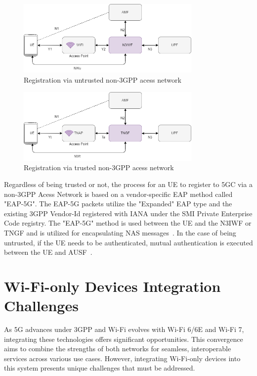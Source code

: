 \begin{figure}[htbp]
    \centering
    \includegraphics[width=0.8\textwidth]{figs/untrusted-non-3gpp-reg.png}
    \caption{Registration via untrusted non-\ac{3GPP} acess network}
    \label{fig:untrusted-non-3gpp-reg}
\end{figure}

\begin{figure}[htbp]
    \centering
    \includegraphics[width=0.8\textwidth]{figs/trusted-non-3gpp-reg.png}
    \caption{Registration via trusted non-\ac{3GPP} acess network}
    \label{fig:trusted-non-3gpp-reg}
\end{figure}

Regardless of being trusted or not, the process for an \ac{UE} to register to \ac{5GC} via a non-\ac{3GPP} Acess Network is based on a vendor-specific \ac{EAP} method called "\ac{EAP}-5G". The \ac{EAP-5G} packets utilize the "Expanded" \ac{EAP} type and the existing \ac{3GPP} Vendor-Id registered with \ac{IANA} under the \ac{SMI} Private Enterprise Code registry. The "\ac{EAP}-5G" method is used between the \ac{UE} and the \ac{N3IWF} or \ac{TNGF} and is utilized for encapsulating \ac{NAS} messages~\cite{23.502-p340}. In the case of being untrusted, if the \ac{UE} needs to be authenticated, mutual authentication is executed between the \ac{UE} and \ac{AUSF}~\cite{23.502-p325}.

\section{Wi-Fi-only Devices Integration Challenges}

As 5G advances under \ac{3GPP} and Wi-Fi evolves with Wi-Fi 6/6E and Wi-Fi 7, integrating these technologies offers significant opportunities. This convergence aims to combine the strengths of both networks for seamless, interoperable services across various use cases. However, integrating Wi-Fi-only devices into this system presents unique challenges that must be addressed.

